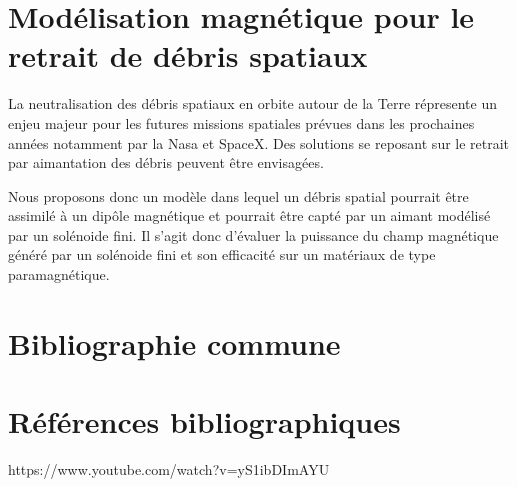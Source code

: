 \documentclass{report}
\begin{document}
\section{Modélisation magnétique pour le retrait de débris spatiaux}

La neutralisation des débris spatiaux en orbite autour de la Terre répresente un enjeu majeur pour les futures missions spatiales prévues dans les prochaines années notamment par la Nasa et SpaceX. Des solutions se reposant sur le retrait par aimantation des débris peuvent être envisagées.

Nous proposons donc un modèle dans lequel un débris spatial pourrait être assimilé à un dipôle magnétique et pourrait être capté par un aimant modélisé par un solénoide fini. Il s'agit donc d'évaluer la puissance du champ magnétique généré par un solénoide fini et son efficacité sur un matériaux de type paramagnétique. 
\section{Bibliographie commune}

\section{Références bibliographiques}
https://www.youtube.com/watch?v=yS1ibDImAYU
\end{document}
